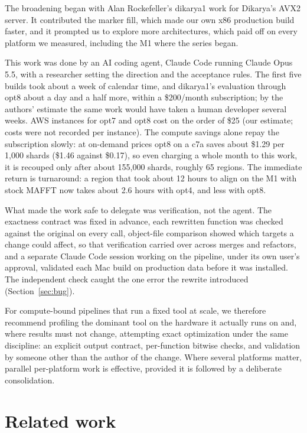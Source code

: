 \documentclass[11pt]{article}
\begin{document}
The broadening began with Alan Rockefeller's dikarya1 work for Dikarya's AVX2 server. It
contributed the marker fill, which made our own x86 production build faster, and it
prompted us to explore more architectures, which paid off on every platform we measured,
including the M1 where the series began.

This work was done by an AI coding agent, Claude Code running Claude Opus 5.5, with a
researcher setting the direction and the acceptance rules. The first five builds took about a
week of calendar time, and dikarya1's evaluation through opt8 about a day and a half more,
within a \$200/month subscription; by the authors' estimate the same work would have taken a
human developer several weeks. AWS instances for opt7 and opt8 cost on the order of \$25 (our
estimate; costs were not recorded per instance). The compute savings alone repay the
subscription slowly: at on-demand prices opt8 on a c7a saves about \$1.29 per 1{,}000 shards
(\$1.46 against \$0.17), so even charging a whole month to this work, it is recouped only after
about 155{,}000 shards, roughly 65 regions. The immediate return is turnaround: a region that
took about 12 hours to align on the M1 with stock MAFFT now takes about 2.6 hours with opt4,
and less with opt8.

What made the work safe to delegate was verification, not the agent. The exactness contract
was fixed in advance, each rewritten function was checked against the original on every call,
object-file comparison showed which targets a change could affect, so that verification
carried over across merges and refactors, and a separate Claude Code session working on the
pipeline, under its own user's approval, validated each Mac build on production data before it
was installed. The independent check caught the one error the rewrite introduced
(Section~\ref{sec:bug}).

For compute-bound pipelines that run a fixed tool at scale, we therefore recommend profiling
the dominant tool on the hardware it actually runs on and, where results must not change,
attempting exact optimization under the same discipline: an explicit output contract,
per-function bitwise checks, and validation by someone other than the author of the change.
Where several platforms matter, parallel per-platform work is effective, provided it is
followed by a deliberate consolidation.

\section{Related work}
\end{document}
